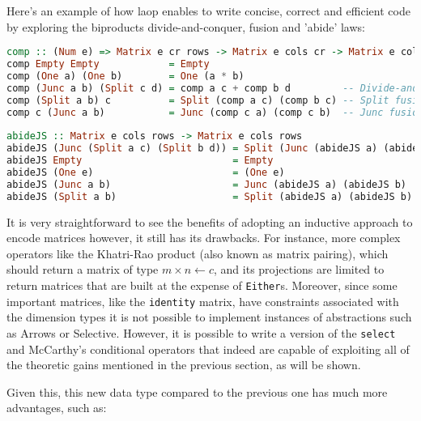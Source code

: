 \documentclass[
  oneside,
  11pt, a4paper,
  footinclude=true,
  headinclude=true,
  cleardoublepage=empty
]{scrbook}
\theoremstyle{definition}
\theoremstyle{definition}
\begin{document}
	    Here's an example of how \gls{laop} enables to write concise, correct and efficient code by exploring the biproducts divide-and-conquer, fusion and 'abide' laws:
	    
        \begin{lstlisting}[language=Haskell, caption={Matrix composition and abiding functions},captionpos=b]
comp :: (Num e) => Matrix e cr rows -> Matrix e cols cr -> Matrix e cols rows
comp Empty Empty            = Empty
comp (One a) (One b)        = One (a * b)
comp (Junc a b) (Split c d) = comp a c + comp b d         -- Divide-and-conquer law
comp (Split a b) c          = Split (comp a c) (comp b c) -- Split fusion law
comp c (Junc a b)           = Junc (comp c a) (comp c b)  -- Junc fusion law
        
abideJS :: Matrix e cols rows -> Matrix e cols rows
abideJS (Junc (Split a c) (Split b d)) = Split (Junc (abideJS a) (abideJS b)) (Junc (abideJS c) (abideJS d)) -- Junc-Split abide law
abideJS Empty                          = Empty
abideJS (One e)                        = (One e)
abideJS (Junc a b)                     = Junc (abideJS a) (abideJS b)
abideJS (Split a b)                    = Split (abideJS a) (abideJS b)
        \end{lstlisting}{}
        
        It is very straightforward to see the benefits of adopting an inductive approach to encode matrices however, it still has its drawbacks. For instance, more complex operators like the Khatri-Rao product (also known as matrix pairing), which should return a matrix of type $m \times n \leftarrow c$, and its projections are limited to return matrices that are built at the expense of \texttt{Either}s. Moreover, since some important matrices, like the \texttt{identity} matrix, have constraints associated with the dimension types it is not possible to implement instances of abstractions such as Arrows or Selective. However, it is possible to write a version of the \texttt{select} and McCarthy's conditional operators that indeed are capable of exploiting all of the theoretic gains mentioned in the previous section, as will be shown.
        
        Given this, this new data type compared to the previous one has much more advantages, such as:
        
\end{document}
